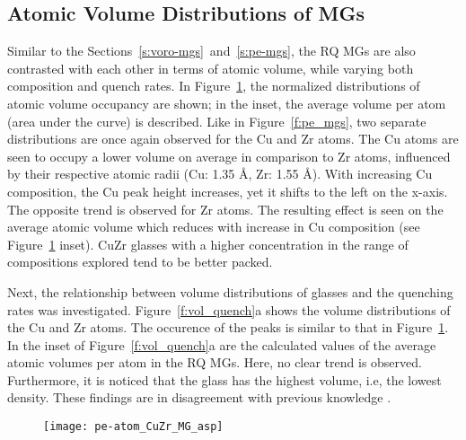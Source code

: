 \subsection{Atomic Volume Distributions of MGs}  \label{s:vol-mgs}
Similar to the Sections~\ref{s:voro-mgs}~and~\ref{s:pe-mgs}, the RQ MGs are also contrasted with each other in terms of atomic volume, while varying both composition and quench rates. In Figure~\ref{f:vol_comp}, the normalized distributions of atomic volume occupancy are shown; in the inset, the average volume per atom (area under the curve) is described. Like in Figure~\ref{f:pe_mgs}, two separate distributions are once again observed for the Cu and Zr atoms. The Cu atoms are seen to occupy a lower volume on average in comparison to Zr atoms, influenced by their respective atomic radii (Cu: 1.35 \r{A}, Zr: 1.55 \r{A}). With increasing Cu composition, the Cu peak height increases, yet it shifts to the left on the x-axis. The opposite trend is observed for Zr atoms. The resulting effect is seen on the average atomic volume which reduces with increase in Cu composition (see Figure~\ref{f:vol_comp} inset). CuZr glasses with a higher concentration in the range of compositions explored tend to be better packed. \par

Next, the relationship between volume distributions of \cz  glasses and the quenching rates was investigated. Figure~\ref{f:vol_quench}a shows the volume distributions of the Cu and Zr atoms. The occurence of the peaks is similar to that in Figure~\ref{f:vol_comp}. In the inset of Figure~\ref{f:vol_quench}a are the calculated values of the average atomic volumes per atom in the RQ MGs. Here, no clear trend is observed. Furthermore, it is noticed that the  glass has the highest volume, i.e, the lowest density. These findings are in disagreement with previous knowledge \cite{Berthier2016,Yue2018}. \par

\begin{figure}
	\centering
	\texttt{[image: pe-atom\_CuZr\_MG\_asp]}
	\label{f:vol_comp}
\end{figure}

